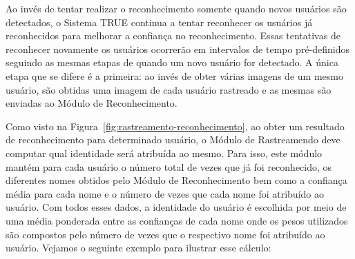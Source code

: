 	
	Ao invés de tentar realizar o reconhecimento somente quando novos usuários são detectados, o Sistema TRUE continua a tentar reconhecer os usuários já reconhecidos para melhorar a confiança no reconhecimento. Essas tentativas de reconhecer novamente os usuários ocorrerão em intervalos de tempo pré-definidos seguindo as mesmas etapas de quando um novo usuário for detectado. A única etapa que se difere é a primeira: ao invés de obter várias imagens de um mesmo usuário, são obtidas uma imagem de cada usuário rastreado e as mesmas são enviadas ao Módulo de Reconhecimento.

	Como visto na Figura~\ref{fig:rastreamento-reconhecimento}, ao obter um resultado de reconhecimento para determinado usuário, o Módulo de Rastreamendo deve computar qual identidade será atribuída ao mesmo. Para isso, este módulo mantém para cada usuário o número total de vezes que já foi reconhecido, os diferentes nomes obtidos pelo Módulo de Reconhecimento bem como a confiança média para cada nome e o número de vezes que cada nome foi atribuído ao usuário. Com todos esses dados, a identidade do usuário é escolhida por meio de uma média ponderada entre as confianças de cada nome onde os pesos utilizados são compostos pelo número de vezes que o respectivo nome foi atribuído ao usuário. Vejamos o seguinte exemplo para ilustrar esse cálculo:

